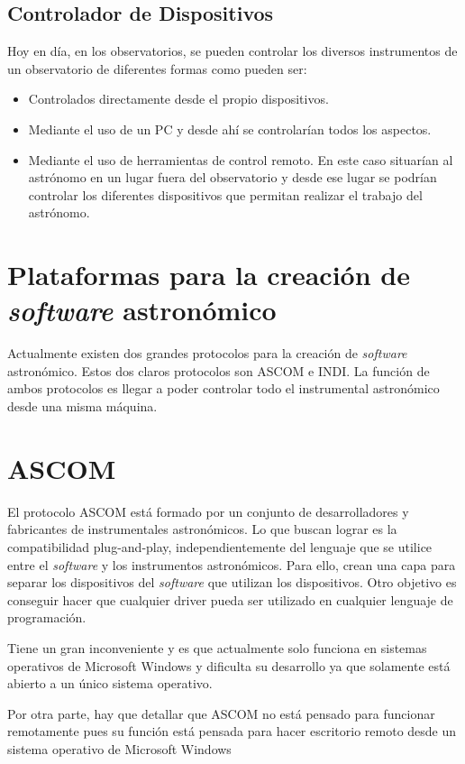 \subsection{Controlador de Dispositivos}
Hoy en día, en los observatorios, se pueden controlar los diversos instrumentos de un observatorio de diferentes formas como pueden ser:

  \begin{itemize}
    \item Controlados directamente desde el propio dispositivos.
    \item Mediante el uso de un PC y desde ahí se controlarían todos los aspectos.
    \item Mediante el uso de herramientas de control remoto. En este caso situarían al astrónomo en un lugar fuera del observatorio y desde ese lugar se podrían controlar los diferentes dispositivos que permitan realizar el trabajo del astrónomo.
  \end{itemize}


\section{Plataformas para la creación de \textit{software} astronómico}
Actualmente existen dos grandes protocolos para la creación de \textit{software} astronómico. Estos dos claros protocolos son ASCOM e INDI.  La función de ambos protocolos es llegar a poder controlar  todo el instrumental astronómico desde una misma máquina.

\section{ASCOM}
El protocolo ASCOM está formado por un conjunto de desarrolladores y fabricantes de instrumentales astronómicos. Lo que buscan lograr es la compatibilidad plug-and-play, independientemente del lenguaje que se utilice entre el \textit{software} y los instrumentos astronómicos. Para ello, crean una capa para separar los dispositivos del \textit{software} que utilizan los dispositivos. Otro objetivo es conseguir hacer que cualquier driver pueda ser utilizado en cualquier lenguaje de programación.

Tiene un gran inconveniente y es que actualmente solo funciona en sistemas operativos de Microsoft Windows y dificulta su desarrollo ya que solamente está abierto a un único sistema operativo.

Por otra parte, hay que detallar que ASCOM no está pensado para funcionar remotamente pues su función está pensada para hacer escritorio remoto desde un sistema operativo de Microsoft Windows


